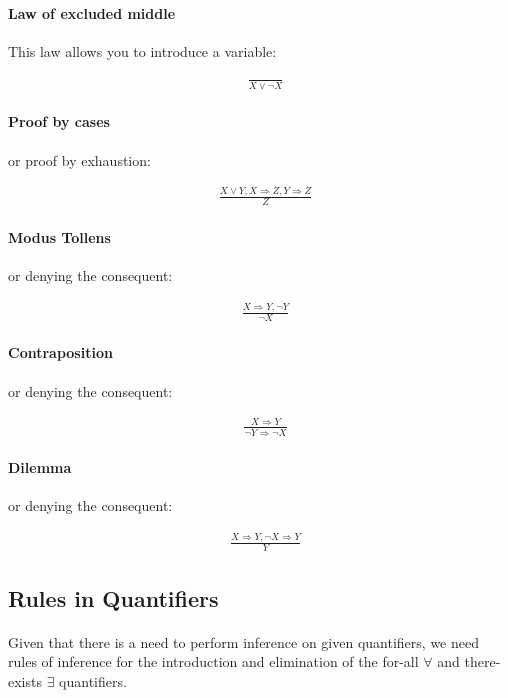 \documentclass{article}
\begin{document}
\begin{multicols}{2}
  \paragraph{Law of excluded middle} This law allows you to introduce a variable:
  
  \begin{align*}
   &\frac{}{X \lor \lnot X}
  \end{align*}  
  
  \paragraph{Proof by cases} or proof by exhaustion:
  
  \begin{align*}
   &\frac{X \lor Y, X \Rightarrow Z, Y \Rightarrow Z}{Z}
  \end{align*}  
  
  \paragraph{Modus Tollens} or denying the consequent:
  
  \begin{align*}
   &\frac{X \Rightarrow Y, \lnot Y}{\lnot X}
  \end{align*}  
  
  \paragraph{Contraposition} or denying the consequent:
  
  \begin{align*}
   &\frac{X \Rightarrow Y}{\lnot Y \Rightarrow \lnot X}
  \end{align*}  
  
  \paragraph{Dilemma} or denying the consequent:
  
  \begin{align*}
   &\frac{X \Rightarrow Y, \lnot X \Rightarrow Y}{Y}
  \end{align*}  
  
  \subsection{Rules in Quantifiers}
  
  \paragraph{} Given that there is a need to perform inference on given quantifiers, we need rules of inference for the introduction and elimination of the for-all $\forall$ and there-exists $\exists$ quantifiers.
  

\end{multicols}
\end{document}
